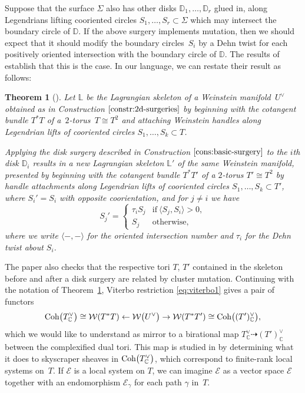 \documentclass[10pt,a4paper]{amsart}
\numberwithin{equation}{section}
\newtheorem{Theorem}{Theorem}[section]
\def\CC{\mathbb{C}}
\def\DD{\mathbb{D}}
\def\LL{\mathbb{L}}
\def\cW{\mathcal{W}}
\def\cE{\mathcal{E}}
\newcommand{\Coh}{\textup{Coh}}
\begin{document}
Suppose that the surface $\Sigma$ also has other disks $\DD_1,\dots,\DD_r$ glued in, along Legendrians lifting cooriented circles $S_1,\dots,S_r\subset \Sigma$ which may intersect the boundary circle of $\DD$. If the above surgery implements mutation, then we should expect that it should modify the boundary circles~$S_i$ by a Dehn twist for each positively oriented intersection with the boundary circle of $\DD$. The results of \cite{STW} establish that this is the case. In our language, we can restate their result as follows:

\begin{Theorem}[{\cite[Theorem 5.7]{STW}}]\label{thm:stw-mutations}
Let $\LL$ be the Lagrangian skeleton of a Weinstein mani\-fold~$U^\vee$ obtained as in Construction $\ref{constr:2d-surgeries}$ by beginning with the cotangent bundle $T^*T$ of a~$2$-torus~$T\cong T^2$ and attaching Weinstein handles along Legendrian lifts of cooriented circles $S_1,\dots,S_k\subset T$.

Applying the disk surgery described in Construction $\ref{cons:basic-surgery}$ to the $i$th disk $\DD_i$ results in a new Lagrangian skeleton $\LL'$ of the same Weinstein manifold, presented by beginning with the cotangent bundle $T^*T'$ of a $2$-torus $T'\cong T^2$ by handle attachments along Legendrian lifts of cooriented circles $S_1,\dots,S_k\subset T'$, where $S_i'=S_i$ with opposite coorientation, and for $j\neq i$ we have
\[
	S_j' = \begin{cases} \tau_iS_j&\text{if}\ \langle S_j, S_i\rangle >0,\\
	 S_j&\text{otherwise},\end{cases}
\]
where we write $\langle -,-\rangle$ for the oriented intersection number and $\tau_i$ for the Dehn twist about $S_i$.
\end{Theorem}

The paper \cite{STW} also checks that the respective tori $T$, $T'$ contained in the skeleton before and after a disk surgery are related by cluster mutation. Continuing with the notation of Theorem~\ref{thm:stw-mutations}, Viterbo restriction \eqref{eq:viterbo1} gives a pair of functors
\begin{equation}
 \Coh\big(T_\CC^\vee\big)\cong\cW(T^*T)\gets \cW\big(U^\vee\big)\to\cW(T^*T')\cong \Coh\big( (T')^\vee_\CC\big),
 \label{eq:viterbo2}
\end{equation}
which we would like to understand as mirror to a birational map $T_\CC^\vee\dashrightarrow(T')^\vee_\CC$ between the complexified dual tori. This map is studied in \cite{STW} by determining what it does to skyscraper sheaves in $\Coh\big(T_\CC^\vee\big)$, which correspond to finite-rank local systems on~$T$. If $\cE$ is a local system on $T$, we can imagine $\cE$ as a vector space $\cE$ together with an endomorphism $\cE_\gamma$ for each path $\gamma$ in~$T$.
\end{document}
